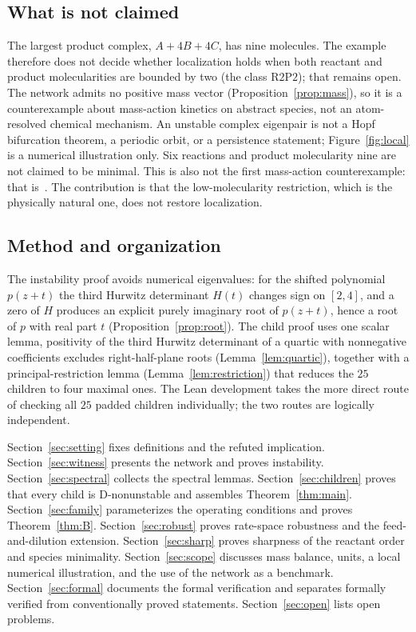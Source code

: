 \documentclass[11pt,a4paper]{article}
\theoremstyle{plain}
\theoremstyle{definition}
\theoremstyle{remark}
\newcommand{\Rpp}{\mathrm{R2P2}}
\begin{document}
\subsection{What is not claimed}

The largest product complex, $A+4B+4C$, has nine molecules. The example therefore does not decide whether localization holds when both reactant and product molecularities are bounded by two (the class $\Rpp$); that remains open. The network admits no positive mass vector (Proposition~\ref{prop:mass}), so it is a counterexample about mass-action kinetics on abstract species, not an atom-resolved chemical mechanism. An unstable complex eigenpair is not a Hopf bifurcation theorem, a periodic orbit, or a persistence statement; Figure~\ref{fig:local} is a numerical illustration only. Six reactions and product molecularity nine are not claimed to be minimal. This is also not the first mass-action counterexample: that is~\cite{KineticOrder2026}. The contribution is that the low-molecularity restriction, which is the physically natural one, does not restore localization.

\subsection{Method and organization}

The instability proof avoids numerical eigenvalues: for the shifted polynomial $p(z+t)$ the third Hurwitz determinant $H(t)$ changes sign on $[2,4]$, and a zero of $H$ produces an explicit purely imaginary root of $p(z+t)$, hence a root of $p$ with real part $t$ (Proposition~\ref{prop:root}). The child proof uses one scalar lemma, positivity of the third Hurwitz determinant of a quartic with nonnegative coefficients excludes right-half-plane roots (Lemma~\ref{lem:quartic}), together with a principal-restriction lemma (Lemma~\ref{lem:restriction}) that reduces the $25$ children to four maximal ones. The Lean development takes the more direct route of checking all $25$ padded children individually; the two routes are logically independent.

Section~\ref{sec:setting} fixes definitions and the refuted implication. Section~\ref{sec:witness} presents the network and proves instability. Section~\ref{sec:spectral} collects the spectral lemmas. Section~\ref{sec:children} proves that every child is D-nonunstable and assembles Theorem~\ref{thm:main}. Section~\ref{sec:family} parameterizes the operating conditions and proves Theorem~\ref{thm:B}. Section~\ref{sec:robust} proves rate-space robustness and the feed-and-dilution extension. Section~\ref{sec:sharp} proves sharpness of the reactant order and species minimality. Section~\ref{sec:scope} discusses mass balance, units, a local numerical illustration, and the use of the network as a benchmark. Section~\ref{sec:formal} documents the formal verification and separates formally verified from conventionally proved statements. Section~\ref{sec:open} lists open problems.
\end{document}
